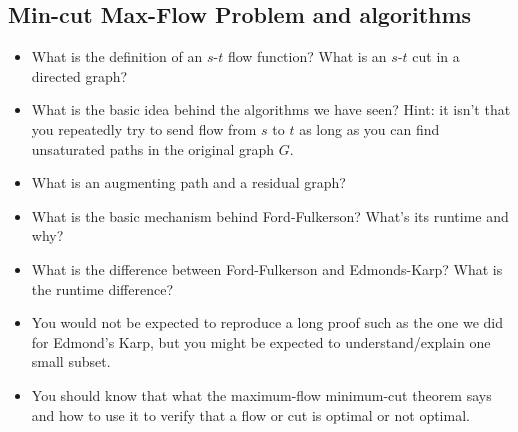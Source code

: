 \documentclass[11  pt]{exam}
\begin{document}
	\subsection{Min-cut Max-Flow Problem and algorithms}

	\begin{itemize}	
		\item What is the definition of an $s$-$t$ flow function? What is an $s$-$t$ cut in a directed graph?
		\item What is the basic idea behind the algorithms we have seen? Hint: it isn't that you repeatedly try to send flow from $s$ to $t$ as long as you can find unsaturated paths in the original graph $G$. 
		\item What is an augmenting path and a residual graph? 
		\item What is the basic mechanism behind Ford-Fulkerson? What's its runtime and why?
		\item What is the difference between Ford-Fulkerson and Edmonds-Karp? What is the runtime difference? 
		\item You would not be expected to reproduce a long proof such as the one we did for Edmond's Karp, but you might be expected to understand/explain one small subset.
		\item You should know that what the maximum-flow minimum-cut theorem says and how to use it to verify that a flow or cut is optimal or not optimal.
	\end{itemize}
	
	
\end{document}
